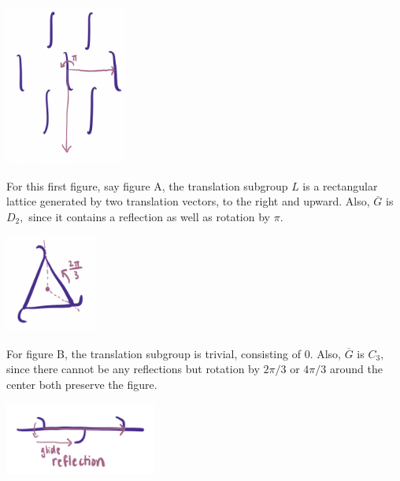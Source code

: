 \begin{center}
\includegraphics[width=4cm]{Lecture Files and Images/lec16-integrals.png}
\end{center}

\begin{example}[A]\label{example a}
For this first figure, say figure A, the translation subgroup $L$ is a rectangular lattice generated by two translation vectors, to the right and upward. Also, $\overline{G}$ is $D_2,$ since it contains a reflection as well as rotation by $\pi.$ 

\end{example}


\begin{center}
    \includegraphics[width=3cm]{Lecture Files and Images/lec16-weirdtriangle.png}
\end{center}


\begin{example}[B]\label{example b}
For figure B, the translation subgroup is trivial, consisting of $0.$ Also, $\overline{G}$ is $C_3,$ since there cannot be any reflections but rotation by $2\pi/3$ or $4\pi/3$ around the center both preserve the figure.

\end{example}


\begin{center}
    \includegraphics[width=5cm]{Lecture Files and Images/lec16-glide.png}
\end{center}

